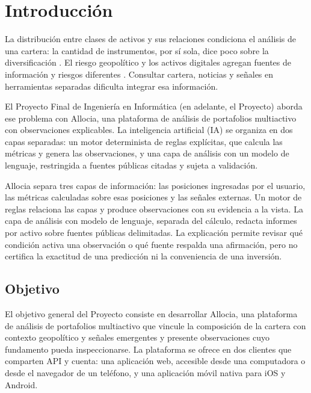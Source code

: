 \chapter{Introducción}\label{chap:introduccion}

La distribución entre clases de activos y sus relaciones condiciona el análisis de una cartera: la cantidad de instrumentos, por sí sola, dice poco sobre la diversificación \parencite{Markowitz1952,SECAssetAllocation}. El riesgo geopolítico y los activos digitales agregan fuentes de información y riesgos diferentes \parencite{CaldaraIacoviello2022,Schar2021}. Consultar cartera, noticias y señales en herramientas separadas dificulta integrar esa información.

El Proyecto Final de Ingeniería en Informática (en adelante, el Proyecto) aborda ese problema con Allocia, una plataforma de análisis de portafolios multiactivo con observaciones explicables. La inteligencia artificial (IA) se organiza en dos capas separadas: un motor determinista de reglas explícitas, que calcula las métricas y genera las observaciones, y una capa de análisis con un modelo de lenguaje, restringida a fuentes públicas citadas y sujeta a validación.

Allocia separa tres capas de información: las posiciones ingresadas por el usuario, las métricas calculadas sobre esas posiciones y las señales externas. Un motor de reglas relaciona las capas y produce observaciones con su evidencia a la vista. La capa de análisis con modelo de lenguaje, separada del cálculo, redacta informes por activo sobre fuentes públicas delimitadas. La explicación permite revisar qué condición activa una observación o qué fuente respalda una afirmación, pero no certifica la exactitud de una predicción ni la conveniencia de una inversión.

\section{Objetivo}\label{sec:objetivo}

El objetivo general del Proyecto consiste en desarrollar Allocia, una plataforma de análisis de portafolios multiactivo que vincule la composición de la cartera con contexto geopolítico y señales emergentes y presente observaciones cuyo fundamento pueda inspeccionarse. La plataforma se ofrece en dos clientes que comparten API y cuenta: una aplicación web, accesible desde una computadora o desde el navegador de un teléfono, y una aplicación móvil nativa para iOS y Android.

